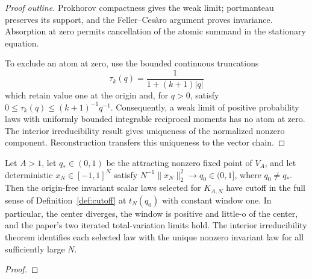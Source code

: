 \begin{proof}[Proof outline]
  \leanok
  Prokhorov compactness gives the weak limit; portmanteau preserves its support,
  and the Feller--Cesàro argument proves invariance. Absorption at zero permits
  cancellation of the atomic summand in the stationary equation.

  To exclude an atom at zero, use the bounded continuous truncations
  \[
    \tau_k(q)=\frac{1}{1+(k+1)|q|}
  \]
  which retain value one at the origin and, for $q>0$, satisfy
  $0\le\tau_k(q)\le(k+1)^{-1}q^{-1}$. Consequently, a weak limit of positive
  probability laws with uniformly bounded integrable reciprocal moments has
  no atom at zero. The interior irreducibility result gives uniqueness of the
  normalized nonzero component. Reconstruction transfers this uniqueness to
  the vector chain.
\end{proof}

\begin{theorem}
  \label{thm:gaussian-process-cutoff}
  \leanok
  Let $A>1$, let $q_\ast\in(0,1)$ be the attracting nonzero fixed point of
  $V_A$, and let deterministic $x_N\in[-1,1]^N$ satisfy
  $N^{-1}\lVert x_N\rVert_2^2\to q_0\in(0,1]$, where $q_0\ne q_\ast$.
  Then the origin-free invariant scalar laws selected for $K_{A,N}$ have cutoff
  in the full sense of Definition~\ref{def:cutoff} at $t_N(q_0)$ with constant
  window one. In particular, the center diverges, the window is positive and
  little-o of the center, and the paper's two iterated total-variation limits
  hold. The interior irreducibility theorem
  identifies each selected law with the unique nonzero invariant law for all
  sufficiently large $N$.
\end{theorem}
\begin{proof}\leanok\end{proof}

